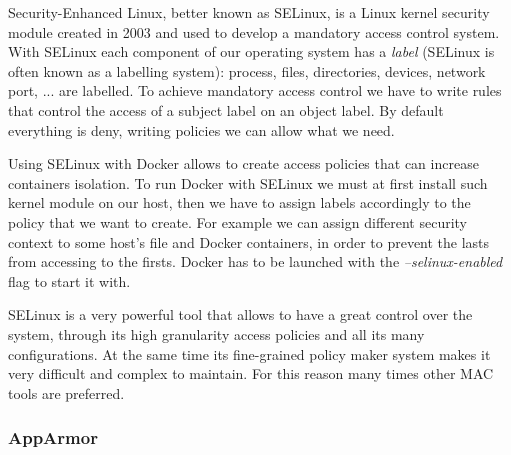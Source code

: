 \documentclass[a4paper,12pt]{article}
\begin{document}
Security-Enhanced Linux, better known as SELinux, is a Linux kernel security
module created in 2003 and used to develop a mandatory access control system.
With SELinux each component of our operating system has a \textit{label}
(SELinux is often known as a labelling system): process, files, directories,
devices, network port, ... are labelled. To achieve mandatory access control
we have to write rules that control the access of a subject label on an object
label. By default everything is deny, writing policies we can allow what we
need. \par Using SELinux with Docker allows to create access policies that can
increase containers isolation. To run Docker with SELinux we must at first
install such kernel module on our host, then we have to assign labels
accordingly to the policy that we want to create. For example we can assign
different security context to some host's file and Docker containers, in order
to prevent the lasts from accessing to the firsts. Docker has to be launched
with the \textit{--selinux-enabled} flag to start it with. \par SELinux is a
very powerful tool that allows to have a great control over the system, through
its high granularity access policies and all its many configurations. At the
same time its fine-grained policy maker system makes it very difficult and
complex to maintain. For this reason many times other MAC tools are preferred.

\subsubsection{AppArmor}
\end{document}
